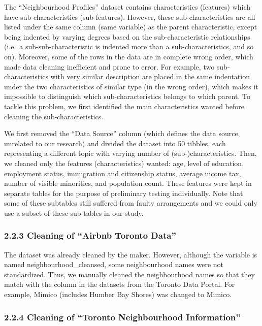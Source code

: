 \documentclass[
]{article}
\begin{document}
The ``Neighbourhood Profiles'' dataset contains characteristics
(features) which have sub-characteristics (sub-features). However, these
sub-characteristics are all listed under the same column (same variable)
as the parent characteristic, except being indented by varying degrees
based on the sub-characteristic relationships (i.e.~a
sub-sub-characteristic is indented more than a sub-characteristics, and
so on). Moreover, some of the rows in the data are in complete wrong
order, which made data cleaning inefficient and prone to error. For
example, two sub-characteristics with very similar description are
placed in the same indentation under the two characteristics of similar
type (in the wrong order), which makes it impossible to distinguish
which sub-characteristics belongs to which parent. To tackle this
problem, we first identified the main characteristics wanted before
cleaning the sub-characteristics.

We first removed the ``Data Source'' column (which defines the data
source, unrelated to our research) and divided the dataset into 50
tibbles, each representing a different topic with varying number of
(sub-)characteristics. Then, we cleaned only the features
(characteristics) wanted: age, level of education, employment status,
immigration and citizenship status, average income tax, number of
visible minorities, and population count. These features were kept in
separate tables for the purpose of preliminary testing individually.
Note that some of these subtables still suffered from faulty
arrangements and we could only use a subset of these sub-tables in our
study.

\hypertarget{cleaning-of-airbnb-toronto-data}{%
\subsubsection{2.2.3 Cleaning of ``Airbnb Toronto
Data''}\label{cleaning-of-airbnb-toronto-data}}

The dataset was already cleaned by the maker. However, although the
variable is named neighbourhood\_cleansed, some neighbourhood names were
not standardized. Thus, we manually cleaned the neighbourhood names so
that they match with the column in the datasets from the Toronto Data
Portal. For example, Mimico (includes Humber Bay Shores) was changed to
Mimico.

\hypertarget{cleaning-of-toronto-neighbourhood-information}{%
\subsubsection{2.2.4 Cleaning of ``Toronto Neighbourhood
Information''}\label{cleaning-of-toronto-neighbourhood-information}}
\end{document}

